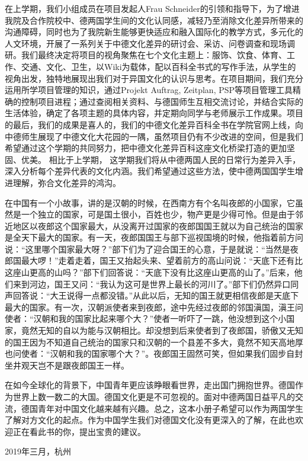 \par
在上学期，我们小组成员在项目发起人Frau Schneider的引领和指导下，为了增进我院及合作院校中、德两国学生间的文化认同感，减轻乃至消除文化差异所带来的沟通障碍，同时也为了我院新生能够更快适应和融入国际化的教学方式，多元化的人文环境，开展了一系列关于中德文化差异的研讨会、采访、问卷调查和现场调研。我们最终决定将项目的视角聚焦在七个文化主题上：服饰、饮食、体育、工作、交通、文化、卫生，以Wiki为载体，配以百科全书式的写作手法，从学生的视角出发，独特地展现出我们对于异国文化的认识与思考。在项目期间，我们充分运用所学项目管理的知识，通过Projekt Auftrag, Zeitplan, PSP等项目管理工具精确的控制项目进程；通过查阅相关资料、与德国师生互相交流讨论，并结合实际的生活体验，确定了各项主题的具体内容，并定期向同学与老师展示工作成果。项目的最后，我们的成果是喜人的，我们的中德文化差异百科全书在学院官网上线，向中德师生展现了中德文化大花园的一隅，虽然项目仍有不少改进的空间，但是我们希望通过这个学期的共同努力，把中德文化差异百科这座文化桥梁打造的更加坚固、优美。 相比于上学期， 这学期我们将从中德两国人民的日常行为差异入手，深入分析每个差异代表的文化内涵。我们希望通过这些方法，使中德两国国学生增进理解，弥合文化差异的鸿沟。
\par
在中国有一个小故事，讲的是汉朝的时候，在西南方有个名叫夜郎的小国家，它虽然是一个独立的国家，可是国土很小，百姓也少，物产更是少得可怜。但是由于邻近地区以夜郎这个国家最大，从没离开过国家的夜郎国国王就以为自己统治的国家是全天下最大的国家。有一天，夜郎国国王与部下巡视国境的时候，他指着前方问说：“这里哪个国家最大呀？”部下们为了迎合国王的心意，于是就说：“当然是夜郎国最大啰！”走着走着，国王又抬起头来、望着前方的高山问说：“天底下还有比这座山更高的山吗？”部下们回答说：“天底下没有比这座山更高的山了。”后来，他们来到河边，国王又问：“我认为这可是世界上最长的河川了。”部下们仍然异口同声回答说：“大王说得一点都没错。”从此以后，无知的国王就更相信夜郎是天底下最大的国家。有一次，汉朝派使者来到夜郎，途中先经过夜郎的邻国滇国，滇王问使者：“汉朝和我的国家比起来哪个大？”使者一听吓了一跳，他没想到这个小国家，竟然无知的自以为能与汉朝相比。却没想到后来使者到了夜郎国，骄傲又无知的国王因为不知道自己统治的国家只和汉朝的一个县差不多大，竟然不知天高地厚也问使者：“汉朝和我的国家哪个大？”。夜郎国王固然可笑，但如果我们固步自封坐井观天岂不是跟夜郎国王一样。
\par
在如今全球化的背景下，中国青年更应该睁眼看世界，走出国门拥抱世界。德国作为世界上数一数二的大国。德国文化更是不可忽视的。面对中德两国日益平凡的交流，德国青年对中国文化越来越有兴趣。总之，这本小册子希望可以作为两国学生了解对方文化的起点。作为中国学生我们对德国文化没有更深入的了解，在此也欢迎正在看此书的你，提出宝贵的建议。
\par
\vspace{\baselineskip} 
\hfill {\heiti 2019年三月，杭州}